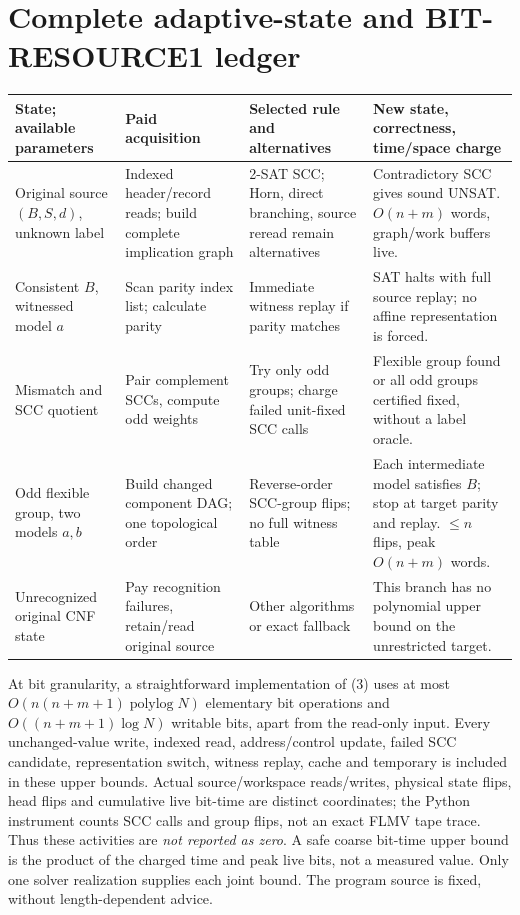 \documentclass[11pt]{article}
\begin{document}
\section{Complete adaptive-state and BIT-RESOURCE1 ledger}
\small
\begin{longtable}{p{.19\linewidth}p{.20\linewidth}p{.23\linewidth}p{.27\linewidth}}
\toprule
State; available parameters & Paid acquisition & Selected rule and alternatives & New state, correctness, time/space charge\\\midrule\endhead
Original source $(B,S,d)$, unknown label & Indexed header/record reads; build complete implication graph & 2-SAT SCC; Horn, direct branching, source reread remain alternatives & Contradictory SCC gives sound UNSAT. $O(n+m)$ words, graph/work buffers live.\\
Consistent $B$, witnessed model $a$ & Scan parity index list; calculate parity & Immediate witness replay if parity matches & SAT halts with full source replay; no affine representation is forced.\\
Mismatch and SCC quotient & Pair complement SCCs, compute odd weights & Try only odd groups; charge failed unit-fixed SCC calls & Flexible group found or all odd groups certified fixed, without a label oracle.\\
Odd flexible group, two models $a,b$ & Build changed component DAG; one topological order & Reverse-order SCC-group flips; no full witness table & Each intermediate model satisfies $B$; stop at target parity and replay. $\le n$ flips, peak $O(n+m)$ words.\\
Unrecognized original CNF state & Pay recognition failures, retain/read original source & Other algorithms or exact fallback & This branch has no polynomial upper bound on the unrestricted target.\\
\bottomrule
\end{longtable}
\normalsize
At bit granularity, a straightforward implementation of (3) uses at most $O(n(n+m+1)\operatorname{polylog}N)$ elementary bit operations and $O((n+m+1)\log N)$ writable bits, apart from the read-only input. Every unchanged-value write, indexed read, address/control update, failed SCC candidate, representation switch, witness replay, cache and temporary is included in these upper bounds. Actual source/workspace reads/writes, physical state flips, head flips and cumulative live bit-time are distinct coordinates; the Python instrument counts SCC calls and group flips, not an exact FLMV tape trace. Thus these activities are \emph{not reported as zero}. A safe coarse bit-time upper bound is the product of the charged time and peak live bits, not a measured value. Only one solver realization supplies each joint bound. The program source is fixed, without length-dependent advice.
\end{document}
